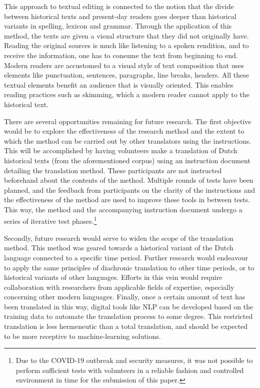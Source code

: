 \begin{paper}
This approach to textual editing is connected to the notion that the
divide between historical texts and present-day readers goes deeper than
historical variants in spelling, lexicon and grammar. Through the
application of this method, the texts are given a visual structure that
they did not originally have. Reading the original sources is much like
listening to a spoken rendition, and to receive the information, one has
to consume the text from beginning to end. Modern readers are accustomed
to a visual style of text composition that uses elements like
punctuation, sentences, paragraphs, line breaks, headers. All these
textual elements benefit an audience that is visually oriented. This
enables reading practices such as skimming, which a modern reader cannot
apply to the historical text.

There are several opportunities remaining for future research. The first
objective would be to explore the effectiveness of the research method
and the extent to which the method can be carried out by other
translators using the instructions. This will be accomplished by having
volunteers make a translation of Dutch historical texts (from the
aforementioned corpus) using an instruction document detailing the
translation method. These participants are not instructed beforehand
about the contents of the method. Multiple rounds of tests have been
planned, and the feedback from participants on the clarity of the
instructions and the effectiveness of the method are used to improve
these tools in between tests. This way, the method and the accompanying
instruction document undergo a series of iterative test
phases.\footnote{Due to the COVID-19 outbreak and security measures, it
  was not possible to perform sufficient tests with volunteers in a
  reliable fashion and controlled environment in time for the submission
  of this paper.}

Secondly, future research would serve to widen the scope of the
translation method. This method was geared towards a historical variant
of the Dutch language connected to a specific time period. Further
research would endeavour to apply the same principles of diachronic
translation to other time periods, or to historical variants of other
languages. Efforts in this vein would require collaboration with
researchers from applicable fields of expertise, especially concerning
other modern languages. Finally, once a certain amount of text has been
translated in this way, digital tools like NLP can be developed based on
the training data to automate the translation process to some degree.
This restricted translation is less hermeneutic than a total
translation, and should be expected to be more receptive to
machine-learning solutions.

\begin{flushleft}
  
\end{flushleft}

\end{paper}